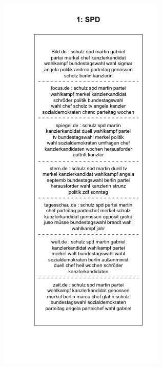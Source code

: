 \documentclass[12pt,a4paper,notitlepage]{article}
\begin{document}
\begin{figure}[H]
	\begin{center}
		\begin{subfigure}[normla]{0.49\textwidth}
			\includegraphics[width=\textwidth]{../figs/plotquote1.png}

\end{subfigure}
\end{center}
\end{figure}
\end{document}
